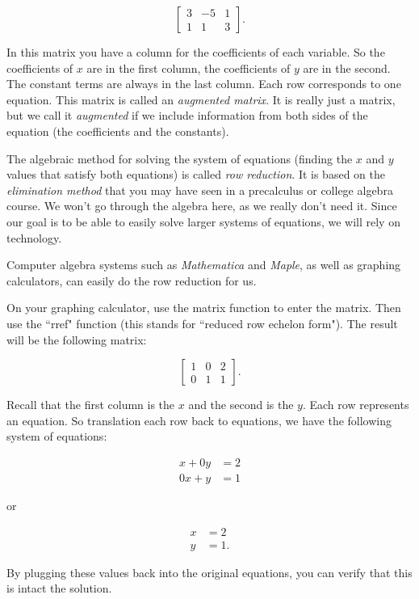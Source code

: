 \[
\left[
\begin{matrix}
3 & -5 & 1\\
1 & 1 & 3
\end{matrix}
\right].
\]

In this matrix you have a column for the coefficients of each variable. So the coefficients of $x$ are in the first column, the coefficients of $y$ are in the second. The constant terms are always in the last column. Each row corresponds to one equation.
This matrix is called an {\it augmented matrix}. It is really just a matrix, but we call it {\it augmented} if we include information from both sides of the equation (the coefficients and the constants).

The algebraic method for solving the system of equations (finding the $x$ and $y$ values that satisfy both equations) is called {\it row reduction}. It is based on the {\it elimination method} that you may have seen in a precalculus or college algebra course. We won't go through the algebra here, as we really don't need it. Since our goal is to be able to easily solve larger systems of equations, we will rely on technology. 

Computer algebra systems such as {\it Mathematica} and {\it Maple}, as well as graphing calculators, can easily do the row reduction for us. 

On your graphing calculator, use the matrix function to enter the matrix. Then use the ``rref" function (this stands for ``reduced row echelon form").  The result will be the following matrix:

\[
\left[
\begin{matrix}
1 & 0 & 2\\
0 & 1 & 1
\end{matrix}
\right].
\]

Recall that the first column is the $x$ and the second is the $y$. Each row represents an equation. So translation each row back to equations, we have the following system of equations:

\begin{align*}
x+0y &=2\\
0x+y &= 1
\end{align*}

or 

\begin{align*}
x &=2\\
y &= 1.
\end{align*}

By plugging these values back into the original equations, you can verify that this is intact the solution.

